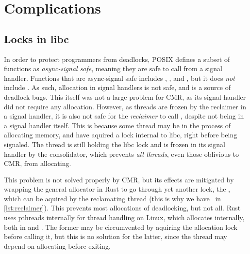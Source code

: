 \section{Complications}
\lorem%

\subsection{Locks in libc\label{sec:alloc-lock}}

In order to protect programmers from deadlocks, POSIX defines a subset of functions as
\emph{async-signal safe}, meaning they are safe to call from a signal handler. Functions that are
async-signal safe includes , , and , but it does \emph{not}
include . As such, allocation in signal handlers is not safe, and is a source of
deadlock bugs. This itself was not a large problem for CMR, as its signal handler did not require
any allocation. However, as threads are frozen by the reclaimer in a signal handler, it is also not
safe for the \emph{reclaimer} to call , despite not being in a signal handler itself.
This is because some thread may be in the process of allocating memory, and have aquired a lock
internal to libc, right before being signaled. The thread is still holding the libc lock and is
frozen in its signal handler by the consolidator, which prevents \emph{all threads}, even those
oblivious to CMR, from allocating.

This problem is not solved properly by CMR, but its effects are mitigated by wrapping the general
allocator in Rust to go through yet another lock, the , which can be aquired by
the reclamating thread (this is why we have~ in \cref{lst:reclaimer}). This
prevents most allocations of deadlocking, but not all. Rust uses \gls{pthreads} internally for thread
handling on Linux, which allocates internally, both in  and . The former may
be circumvented by aquiring the allocation lock before calling it, but this is no solution for the
latter, since the thread may depend on allocating before exiting.




